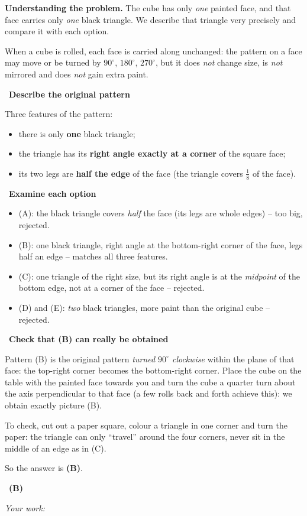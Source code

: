 \documentclass[11pt]{article}
\newif\ifsol \solfalse
\providecommand{\AnsWord}{Đáp số}
\newcommand{\StuProb}[2]{\begin{probboxS}{#1}{#2}\StuProbBody\end{probboxS}}
\newcommand{\ans}[1]{\par\smallskip{\bfseries\color{tmGreen!88!black}\AnsWord:}\ {\bfseries\color{AnsRed}#1}\par}
\newcommand{\probsol}[1]{%
  \begin{lrbox}{\solmeasure}\begin{minipage}{\dimexpr\linewidth-24pt\relax}#1\end{minipage}\end{lrbox}%
  \ifsol
    \begin{solbox}#1\end{solbox}%
  \else
    \setlength{\solht}{\dimexpr\ht\solmeasure+\dp\solmeasure+0.85cm\relax}%
    \ifdim\solht<1.35cm\setlength{\solht}{1.35cm}\fi
    \ifdim\solht>\StudentMaxWork\setlength{\solht}{\StudentMaxWork}\fi
    \par\noindent\begin{minipage}{\linewidth}%
    \expandafter\StuProb\StuProbArgs
    \begin{tcolorbox}[colback=white,colframe=Line,boxrule=0.8pt,arc=5pt,
      left=8pt,right=8pt,top=4pt,bottom=4pt,height=\solht]{\footnotesize\color{Slate}\itshape\WorkWord}\end{tcolorbox}%
    \end{minipage}\par\medskip
  \fi}
\newlength{\StudentMaxWork}\setlength{\StudentMaxWork}{4.5cm}
\newcommand{\step}[2]{\par\smallskip\noindent{\bfseries\color{tmBlue!85!black}\StepWord~#1.}\ {\bfseries #2}\par\nopagebreak}
\def\WorkWord{Your work:}
\def\AnsWord{Answer}
\def\StepWord{Step}
\begin{document}
\probsol{
\textbf{Understanding the problem.} The cube has only \emph{one} painted face, and that face carries only \emph{one} black triangle. We describe that triangle very precisely and compare it with each option.
\begin{recallbox}When a cube is rolled, each face is carried along unchanged: the pattern on a face may move or be turned by $90^\circ$, $180^\circ$, $270^\circ$, but it does \emph{not} change size, is \emph{not} mirrored and does \emph{not} gain extra paint.\end{recallbox}
\step{1}{Describe the original pattern}
Three features of the pattern:
\begin{itemize}[leftmargin=1.3em,itemsep=0pt,topsep=0pt]
  \item there is only \textbf{one} black triangle;
  \item the triangle has its \textbf{right angle exactly at a corner} of the square face;
  \item its two legs are \textbf{half the edge} of the face (the triangle covers $\frac18$ of the face).
\end{itemize}

\step{2}{Examine each option}
\begin{itemize}[leftmargin=1.3em,itemsep=1pt,topsep=0pt]
  \item (A): the black triangle covers \emph{half} the face (its legs are whole edges) -- too big, rejected.
  \item (B): one black triangle, right angle at the bottom-right corner of the face, legs half an edge -- matches all three features.
  \item (C): one triangle of the right size, but its right angle is at the \emph{midpoint} of the bottom edge, not at a corner of the face -- rejected.
  \item (D) and (E): \emph{two} black triangles, more paint than the original cube -- rejected.
\end{itemize}

\step{3}{Check that (B) can really be obtained}
Pattern (B) is the original pattern \emph{turned $90^\circ$ clockwise} within the plane of that face: the top-right corner becomes the bottom-right corner. Place the cube on the table with the painted face towards you and turn the cube a quarter turn about the axis perpendicular to that face (a few rolls back and forth achieve this): we obtain exactly picture (B).
\begin{tipbox}To check, cut out a paper square, colour a triangle in one corner and turn the paper: the triangle can only ``travel'' around the four corners, never sit in the middle of an edge as in (C).\end{tipbox}
So the answer is \textbf{(B)}.
\ans{(B)}
}
\end{document}
